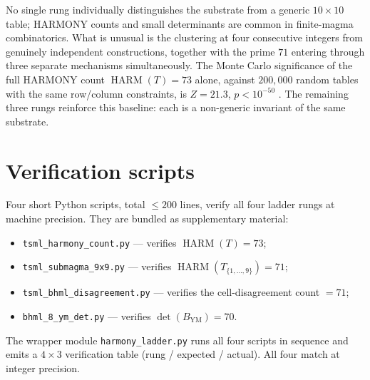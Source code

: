 \documentclass[11pt,reqno]{amsart}
\theoremstyle{definition}
\DeclareMathOperator{\HARM}{HARM}
\begin{document}
No single rung individually distinguishes the substrate from a
generic $10 \times 10$ table; HARMONY counts and small determinants
are common in finite-magma combinatorics. What is unusual is the
clustering at four consecutive integers from genuinely independent
constructions, together with the prime $71$ entering through three
separate mechanisms simultaneously. The Monte Carlo significance of
the full HARMONY count $\HARM(T) = 73$ alone, against $200{,}000$
random tables with the same row/column constraints, is
$Z = 21.3$, $p < 10^{-50}$ \cite{Sanders2026CLAxioms}. The remaining
three rungs reinforce this baseline: each is a non-generic invariant
of the same substrate.

\section*{Verification scripts}

Four short Python scripts, total $\leq 200$ lines, verify all four
ladder rungs at machine precision. They are bundled as supplementary
material:

\begin{itemize}[leftmargin=*]
\item \texttt{tsml\_harmony\_count.py} — verifies $\HARM(T) = 73$;
\item \texttt{tsml\_submagma\_9x9.py} — verifies $\HARM(T_{\{1,\ldots,9\}}) = 71$;
\item \texttt{tsml\_bhml\_disagreement.py} — verifies the cell-disagreement count $= 71$;
\item \texttt{bhml\_8\_ym\_det.py} — verifies $\det(B_{\mathrm{YM}}) = 70$.
\end{itemize}

The wrapper module \texttt{harmony\_ladder.py} runs all four scripts
in sequence and emits a $4 \times 3$ verification table
(rung / expected / actual). All four match at integer precision.
\end{document}
